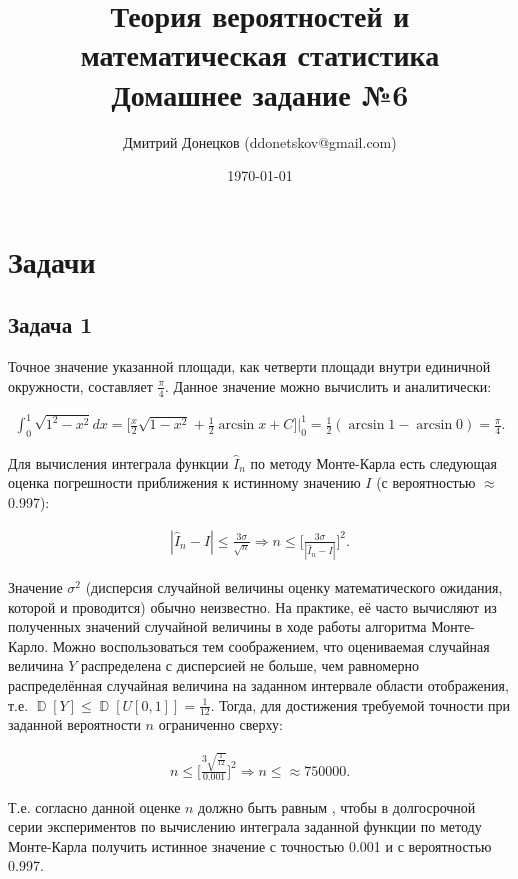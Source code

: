 \documentclass[a4paper,11pt]{article}
\title{\vspace{-1.5cm}Теория вероятностей и математическая статистика \\
Домашнее задание №6}
\author{Дмитрий Донецков (ddonetskov@gmail.com)}
\date{\today}
\DeclareMathOperator*{\D}{\mathbb{D}}   %
\begin{document}
\maketitle

\section{Задачи}

\subsection{Задача 1}

Точное значение указанной площади, как четверти площади внутри единичной окружности, составляет $\frac{\pi}{4}$. Данное значение можно вычислить и аналитически:

\begin{align*}
\int_{0}^{1} \sqrt{1^2 - x^2}dx 
= \bigg[\frac{x}{2}\sqrt{1-x^2} + \frac{1}{2}\arcsin{x} + C\bigg]\bigg\rvert_0^1
= \frac{1}{2}(\arcsin{1} - \arcsin{0}) = \frac{\pi}{4}.
\end{align*}

Для вычисления интеграла функции $\hat{I}_n$ по методу Монте-Карла есть следующая оценка погрешности приближения к истинному значению $I$ (с вероятностью $\approx$ 0.997):

\begin{align*}
|\hat{I}_n - I| \leq \frac{3\sigma}{\sqrt{n}}
\Rightarrow
n \leq \bigg[\frac{3\sigma}{|\hat{I}_n - I|}\bigg]^2.
\end{align*}

Значение $\sigma^2$ (дисперсия случайной величины оценку математического ожидания, которой и проводится) обычно неизвестно. На практике, её часто вычисляют из полученных значений случайной величины в ходе работы алгоритма Монте-Карло. Можно воспользоваться тем соображением, что оцениваемая случайная величина $Y$ распределена с дисперсией не больше, чем равномерно распределённая случайная величина на заданном интервале области отображения, т.е. $\D[Y] \leq \D[U[0,1]] = \frac{1}{12}$. Тогда, для достижения требуемой точности при заданной вероятности $n$ ограниченно сверху:

\begin{align*}
n \leq \bigg[\frac{3\sqrt{\frac{1}{12}}}{0.001}\bigg]^2 \Rightarrow
\boxed{n \leq \approx 750000}.
\end{align*}

Т.е. согласно данной оценке $n$ должно быть равным , чтобы в долгосрочной серии экспериментов по вычислению интеграла заданной функции по методу Монте-Карла получить истинное значение с точностью 0.001 и с вероятностью 0.997.
\end{document}
